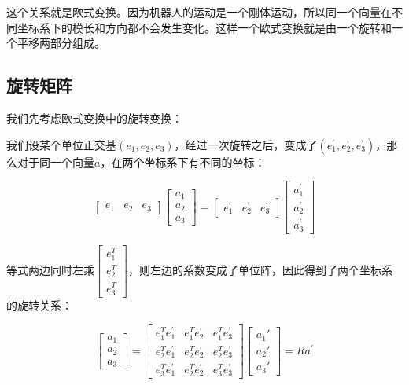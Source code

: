 \documentclass[9pt, oneside]{book}
\begin{document}
这个关系就是欧式变换。因为机器人的运动是一个刚体运动，所以同一个向量在不同坐标系下的模长和方向都不会发生变化。这样一个欧式变换就是由一个旋转和一个平移两部分组成。

\subsection{旋转矩阵}

我们先考虑欧式变换中的旋转变换：

我们设某个单位正交基$(e_1,e_2,e_3)$，经过一次旋转之后，变成了$(e_1^\prime,e_2^\prime,e_3^\prime)$，那么对于同一个向量$a$，在两个坐标系下有不同的坐标：

\begin{equation}
    \begin{bmatrix}
        e_1 & e_2 & e_3
       \end{bmatrix}
       \begin{bmatrix}
        a_1\\
        a_2\\
        a_3
       \end{bmatrix}
       =
       \begin{bmatrix}
        e_1^\prime & e_2^\prime  & e_3^\prime 
       \end{bmatrix}
       \begin{bmatrix}
        a_1^\prime \\
        a_2^\prime \\
        a_3^\prime 
        \end{bmatrix}
\end{equation}

等式两边同时左乘$\begin{bmatrix}
    e_1^T\\
    e_2^T\\
    e_3^T
   \end{bmatrix}$，则左边的系数变成了单位阵，因此得到了两个坐标系的旋转关系：

\begin{equation}
    \begin{bmatrix}
        a_1\\
        a_2\\
        a_3
       \end{bmatrix}
       =
       \begin{bmatrix}
        e_1^Te_1^\prime & e_1^Te_2^\prime & e_1^Te_3^\prime\\
        e_2^Te_1^\prime & e_2^Te_2^\prime & e_2^Te_3^\prime\\
        e_3^Te_1^\prime & e_2^Te_2^\prime & e_3^Te_3^\prime
       \end{bmatrix}
       \begin{bmatrix}
        a_1\prime \\
        a_2\prime \\
        a_3\prime 
       \end{bmatrix}
       =
       Ra^\prime 
\end{equation}
\end{document}
